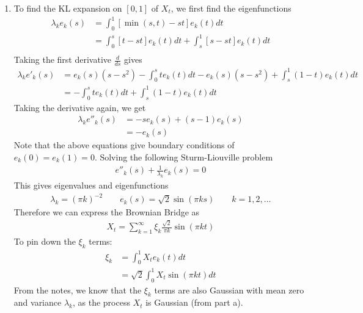 \documentclass[12pt]{article}
\theoremstyle{plain}
\theoremstyle{definition}
\theoremstyle{remark}
\begin{document}
\begin{enumerate}
\begin{enumerate}
      \item %
        To find the KL expansion on $[0,1]$ of $X_t$, we first find the
        eigenfunctions
        \begin{align*}
          \lambda_k e_k(s) &=
          \int^1_0 \left[ \min(s,t) - st\right]e_k(t) dt \\
          &=
          \int^s_0 \left[t - st\right]e_k(t) dt +
          \int^1_s \left[ s - st\right]e_k(t) dt \\
        \end{align*}
        Taking the first derivative $\frac{d}{ds}$ gives
        \begin{align*}
          \lambda_k e'_k(s) &=
          e_k(s)(s-s^2) - \int^s_0 te_k(t) dt
          -  e_k(s)(s-s^2) + \int^1_s (1-t) e_k(t) dt \\
          &= - \int^s_0 te_k(t) dt
           + \int^1_s (1-t) e_k(t) dt
        \end{align*}
        Taking the derivative again, we get
        \begin{align*}
          \lambda_k e''_k(s) &=  -s e_k(s) + (s-1)e_k(s)\\
          &= -e_k(s)
        \end{align*}
        Note that the above equations give boundary conditions of
        $e_k(0)=e_k(1)=0$. Solving the following Sturm-Liouville problem
        \begin{align*}
          e''_k(s) +\frac{1}{\lambda_k} e_k(s) = 0
        \end{align*}
        This gives eigenvalues and eigenfunctions
        \begin{align*}
          \lambda_k = \left(\pi k\right)^{-2}
          \qquad
          e_k(s) = \sqrt{2} \sin\left( \pi ks \right)
          \qquad k = 1,2,\ldots
        \end{align*}
        Therefore we can express the Brownian Bridge as
        \begin{align*}
          X_t = \sum_{k=1}^\infty \xi_k \frac{\sqrt{2}}{\pi k}
          \sin(\pi kt)
        \end{align*}
        To pin down the $\xi_k$ terms:
        \begin{align*}
          \xi_k
            &= \int^1_0 X_t e_k(t) dt \\
            &= \sqrt{2} \int^1_0 X_t \sin(\pi k t) dt 
        \end{align*}
        From the notes, we know that the $\xi_k$ terms are also Gaussian
        with mean zero and variance $\lambda_k$, as the process $X_t$ is
        Gaussian (from part a).



\end{enumerate}
\end{enumerate}
\end{document}
